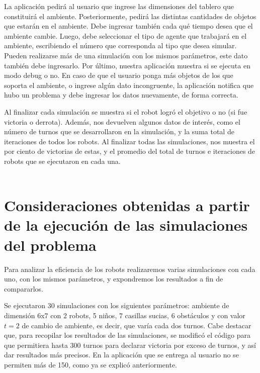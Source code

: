 \documentclass[twoside]{article}
\begin{document}
La aplicaci\'on pedir\'a al usuario que ingrese las dimensiones del tablero que constituir\'a el ambiente. Posteriormente, pedir\'a las distintas cantidades de objetos que estar\'an en el ambiente. Debe ingresar tambi\'en cada qu\'e tiempo desea que el ambiente cambie. Luego, debe seleccionar el tipo de agente que trabajar\'a en el ambiente, escribiendo el n\'umero que corresponda al tipo que desea simular. Pueden realizarse m\'as de una simulaci\'on con los mismos par\'ametros, este dato tambi\'en debe ingresarlo. Por \'ultimo, nuestra aplicaci\'on muestra si se ejecuta en modo debug o no. En caso de que el usuario ponga m\'as objetos de los que soporta el ambiente, o ingrese alg\'un dato incongruente, la aplicaci\'on notifica que hubo un problema y debe ingresar los datos nuevamente, de forma correcta.

Al finalizar cada simulaci\'on se muestra si el robot logr\'o el objetivo o no (si fue victoria o derrota). Adem\'as, nos devuelven algunos datos de inter\'es, como el n\'umero de turnos que se desarrollaron en la simulaci\'on, y la suma total de iteraciones de todos los robots. Al finalizar todas las simulaciones, nos muestra el por ciento de victorias de estas, y el promedio del total de turnos e iteraciones de robots que se ejecutaron en cada una.\\\\


\section{Consideraciones obtenidas a partir de la ejecuci\'on de las simulaciones del problema}
Para analizar la eficiencia de los robots realizaremos varias simulaciones con cada uno, con los mismos par\'ametros, y expondremos los resultados a fin de compararlos.

Se ejecutaron 30 simulaciones con los siguientes par\'ametros: ambiente de dimensi\'on 6x7 con 2 robots, 5 ni\~nos, 7 casillas sucias, 6 obst\'aculos y con valor $t=2$ de cambio de ambiente, es decir, que var\'ia cada dos turnos. Cabe destacar que, para recopilar los resultados de las simulaciones, se modific\'o el c\'odigo para que permitiera hasta 300 turnos para declarar victoria por exceso de turnos, y as\'i dar resultados m\'as precisos. En la aplicaci\'on que se entrega al usuario no se permiten m\'as de 150, como ya se explic\'o anteriormente.\\
\end{document}
